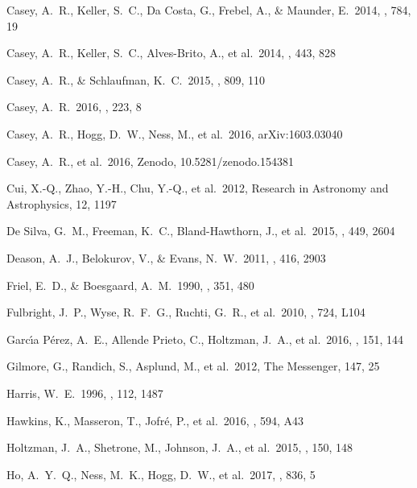 \documentclass[preprint]{aastex61}
\begin{document}
\begin{thebibliography}{dummy}
 Casey, A.~R., Keller, S.~C., Da Costa, G., Frebel, A., \& Maunder, E.\ 2014, \apj, 784, 19 

 Casey, A.~R., Keller, S.~C., Alves-Brito, A., et al.\ 2014, \mnras, 443, 828 

 Casey, A.~R., \& Schlaufman, K.~C.\ 2015, \apj, 809, 110 

 Casey, A.~R.\ 2016, \apjs, 223, 8 

 Casey, A.~R., Hogg, D.~W., Ness, M., et al.\ 2016, arXiv:1603.03040 

 Casey, A.~R., et al.\ 2016, Zenodo, 10.5281/zenodo.154381

 Cui, X.-Q., Zhao, Y.-H., Chu, Y.-Q., et al.\ 2012, Research in Astronomy and Astrophysics, 12, 1197 

 De Silva, G.~M., Freeman, K.~C., Bland-Hawthorn, J., et al.\ 2015, \mnras, 449, 2604 

 Deason, A.~J., Belokurov, V., \& Evans, N.~W.\ 2011, \mnras, 416, 2903 

 Friel, E.~D., \& Boesgaard, A.~M.\ 1990, \apj, 351, 480 

 Fulbright, J.~P., Wyse, R.~F.~G., Ruchti, G.~R., et al.\ 2010, \apjl, 724, L104 

 Garc{\'{\i}}a P{\'e}rez, A.~E., Allende Prieto, C., Holtzman, J.~A., et al.\ 2016, \aj, 151, 144 

 Gilmore, G., Randich, S., Asplund, M., et al.\ 2012, The Messenger, 147, 25

 Harris, W.~E.\ 1996, \aj, 112, 1487 

 Hawkins, K., Masseron, T., Jofr{\'e}, P., et al.\ 2016, \aap, 594, A43 

 Holtzman, J.~A., Shetrone, M., Johnson, J.~A., et al.\ 2015, \aj, 150, 148 

 Ho, A.~Y.~Q., Ness, M.~K., Hogg, D.~W., et al.\ 2017, \apj, 836, 5
 

\end{thebibliography}
\end{document}
